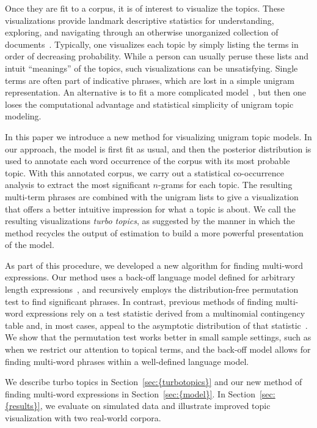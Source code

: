 \documentclass[11pt]{article}
\begin{document}
Once they are fit to a corpus, it is of interest to visualize the
topics.  These visualizations provide landmark descriptive statistics
for understanding, exploring, and navigating through an otherwise
unorganized collection of documents~\cite{Mimno:2007}.  Typically, one
visualizes each topic by simply listing the terms in order of
decreasing probability.  While a person can usually peruse these lists
and intuit ``meanings'' of the topics, such visualizations can be
unsatisfying.  Single terms are often part of indicative phrases,
which are lost in a simple unigram representation.  An alternative is
to fit a more complicated
model~\citep{Girolami:2004,Wallach:2006,Wang:2007}, but then one loses
the computational advantage and statistical simplicity of unigram
topic modeling.

In this paper we introduce a new method for visualizing unigram topic
models.  In our approach, the model is first fit as usual, and then
the posterior distribution is used to annotate each word occurrence of
the corpus with its most probable topic.  With this annotated corpus, we
carry out a statistical co-occurrence analysis to extract the most
significant $n$-grams for each topic.  The resulting multi-term
phrases are combined with the unigram lists to give a visualization
that offers a better intuitive impression for what a topic is about.
We call the resulting visualizations \textit{turbo topics}, as
suggested by the manner in which the method recycles the output of
estimation to build a more powerful presentation of the model.

As part of this procedure, we developed a new algorithm for finding
multi-word expressions.  Our method uses a back-off language model
defined for arbitrary length expressions~\cite{Katz:1987}, and
recursively employs the distribution-free permutation test to find
significant phrases.  In contrast, previous methods of finding
multi-word expressions rely on a test statistic derived from a
multinomial contingency table and, in most cases, appeal to the
asymptotic distribution of that statistic~\cite{Manning:1999}.  We
show that the permutation test works better in small sample settings,
such as when we restrict our attention to topical terms, and the
back-off model allows for finding multi-word phrases within a
well-defined language model.

We describe turbo topics in {Section~\ref{sec:{turbotopics}}} and our new method of
finding multi-word expressions in {Section~\ref{sec:{model}}}.  In {Section~\ref{sec:{results}}},
we evaluate on simulated data and illustrate improved topic
visualization with two real-world corpora.
\end{document}
